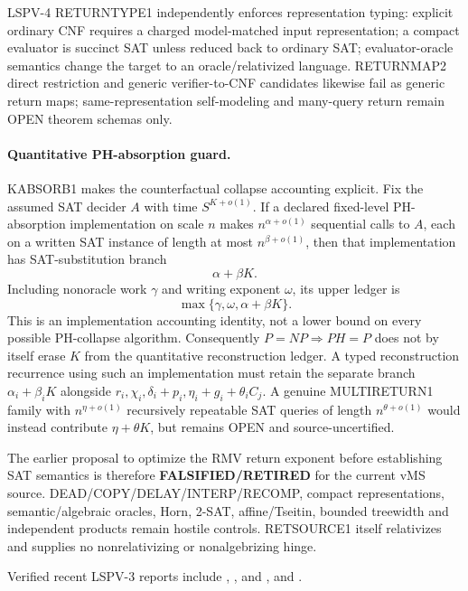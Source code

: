 \documentclass[11pt]{article}
\begin{document}
LSPV-4 RETURNTYPE1 independently enforces representation typing: explicit ordinary CNF requires a charged model-matched input representation; a compact evaluator is succinct SAT unless reduced back to ordinary SAT; evaluator-oracle semantics change the target to an oracle/relativized language. RETURNMAP2 direct restriction and generic verifier-to-CNF candidates likewise fail as generic return maps; same-representation self-modeling and many-query return remain OPEN theorem schemas only.

\paragraph{Quantitative PH-absorption guard.}
KABSORB1 makes the counterfactual collapse accounting explicit. Fix the assumed SAT decider \(A\) with time \(S^{K+o(1)}\). If a declared fixed-level PH-absorption implementation on scale \(n\) makes \(n^{\alpha+o(1)}\) sequential calls to \(A\), each on a written SAT instance of length at most \(n^{\beta+o(1)}\), then that implementation has SAT-substitution branch
\[
\alpha+\beta K.
\]
Including nonoracle work \(\gamma\) and writing exponent \(\omega\), its upper ledger is
\[
\max\{\gamma,\omega,\alpha+\beta K\}.
\]
This is an implementation accounting identity, not a lower bound on every possible PH-collapse algorithm. Consequently \(P=NP\Rightarrow PH=P\) does not by itself erase \(K\) from the quantitative reconstruction ledger. A typed reconstruction recurrence using such an implementation must retain the separate branch \(\alpha_i+\beta_iK\) alongside \(r_i,\chi_i,\delta_i+p_i,\eta_i+g_i+\theta_iC_j\). A genuine MULTIRETURN1 family with \(n^{\eta+o(1)}\) recursively repeatable SAT queries of length \(n^{\theta+o(1)}\) would instead contribute \(\eta+\theta K\), but remains OPEN and source-uncertified.

The earlier proposal to optimize the RMV return exponent before establishing SAT semantics is therefore \textbf{FALSIFIED/RETIRED} for the current vMS source. DEAD/COPY/DELAY/INTERP/RECOMP, compact representations, semantic/algebraic oracles, Horn, 2-SAT, affine/Tseitin, bounded treewidth and independent products remain hostile controls. RETSOURCE1 itself relativizes and supplies no nonrelativizing or nonalgebrizing hinge.

Verified recent LSPV-3 reports include
,
, and
, and
.
\end{document}
